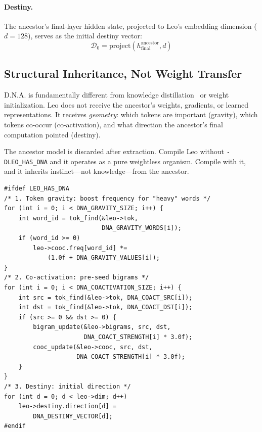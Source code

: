 \documentclass[11pt,twocolumn]{article}
\begin{document}
\paragraph{Destiny.} The ancestor's final-layer hidden state, projected to Leo's embedding dimension ($d = 128$), serves as the initial destiny vector:
\begin{equation}
  \mathcal{D}_0 = \text{project}(h_{\text{final}}^{\text{ancestor}}, d)
\end{equation}

\subsection{Structural Inheritance, Not Weight Transfer}

D.N.A. is fundamentally different from knowledge distillation~\citep{hinton2015distilling} or weight initialization. Leo does not receive the ancestor's weights, gradients, or learned representations. It receives \textit{geometry}: which tokens are important (gravity), which tokens co-occur (co-activation), and what direction the ancestor's final computation pointed (destiny).

The ancestor model is discarded after extraction. Compile Leo without \texttt{-DLEO\_HAS\_DNA} and it operates as a pure weightless organism. Compile with it, and it inherits instinct---not knowledge---from the ancestor.

\begin{lstlisting}[style=cstyle, caption={D.N.A. application during bootstrap (from leo.c)}]
#ifdef LEO_HAS_DNA
/* 1. Token gravity: boost frequency for "heavy" words */
for (int i = 0; i < DNA_GRAVITY_SIZE; i++) {
    int word_id = tok_find(&leo->tok,
                           DNA_GRAVITY_WORDS[i]);
    if (word_id >= 0)
        leo->cooc.freq[word_id] *=
            (1.0f + DNA_GRAVITY_VALUES[i]);
}
/* 2. Co-activation: pre-seed bigrams */
for (int i = 0; i < DNA_COACTIVATION_SIZE; i++) {
    int src = tok_find(&leo->tok, DNA_COACT_SRC[i]);
    int dst = tok_find(&leo->tok, DNA_COACT_DST[i]);
    if (src >= 0 && dst >= 0) {
        bigram_update(&leo->bigrams, src, dst,
                      DNA_COACT_STRENGTH[i] * 3.0f);
        cooc_update(&leo->cooc, src, dst,
                    DNA_COACT_STRENGTH[i] * 3.0f);
    }
}
/* 3. Destiny: initial direction */
for (int d = 0; d < leo->dim; d++)
    leo->destiny.direction[d] =
        DNA_DESTINY_VECTOR[d];
#endif
\end{lstlisting}

\end{document}

